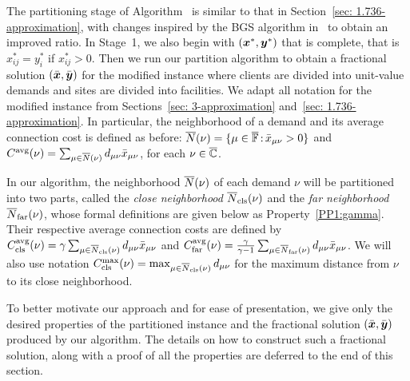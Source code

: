 \documentclass[11pt]{article}
\begin{document}

 The
partitioning stage of Algorithm~{\EBGS} is similar to that
in Section~\ref{sec: 1.736-approximation}, with changes
inspired by the BGS algorithm in~\cite{ByrkaGS10} to obtain
an improved ratio. In Stage~1, we also begin with
$(\boldsymbol{x}^\ast, \boldsymbol{y}^\ast)$ that is complete, that is
$x_{ij}^\ast=y_i^\ast$ if $x_{ij}^\ast>0$. Then we run our
partition algorithm to obtain a fractional solution
$(\bar{\boldsymbol{x}}, \bar{\boldsymbol{y}})$ for the modified instance where clients
are divided into unit-value demands and sites are divided
into facilities. We adapt all notation for the modified
instance from Sections~\ref{sec: 3-approximation}
and~\ref{sec: 1.736-approximation}. In particular, the
neighborhood of a demand and its average connection cost is
defined as before:
${\overline{N}}(\nu)=\{\mu\in\overline{\mathbb{F}}{\,:\,}
{\bar x}_{\mu\nu}>0\}$ and
$C^{{\mbox{\scriptsize\rm avg}}}(\nu)=\sum_{\mu\in{\overline{N}}(\nu)}d_{\mu\nu}{\bar x}_{\mu\nu}$,
for each $\nu\in\overline{\mathbb{C}}$.

In our algorithm, the neighborhood ${\overline{N}}(\nu)$ of each
demand $\nu$ will be partitioned into two parts, called the
\emph{close neighborhood} ${\overline{N}}_{\text{cls}}(\nu)$ and the
\emph{far neighborhood} ${\overline{N}}_{\text{far}}(\nu)$, whose formal
definitions are given below as
Property~\ref{PP1:gamma}. Their respective average
connection costs are defined by
$C_{\text{cls}}^{{\mbox{\scriptsize\rm avg}}}(\nu)=\gamma\sum_{\mu\in{\overline{N}}_{\text{cls}}(\nu)}
d_{\mu\nu}{\bar x}_{\mu\nu}$ and
$C_{\text{far}}^{{\mbox{\scriptsize\rm avg}}}(\nu)=\frac{\gamma}{\gamma-1}\sum_{\mu\in{\overline{N}}_{\text{far}}(\nu)}
d_{\mu\nu}{\bar x}_{\mu\nu}$.  We will also use notation
$C_{\text{cls}}^{\max}(\nu)=\max_{\mu\in{\overline{N}}_{\text{cls}}(\nu)} d_{\mu\nu}$ for
the maximum distance from $\nu$ to its close neighborhood.

\smallskip 

To better motivate our approach and for ease of
presentation, we give only the desired properties of the
partitioned instance and the fractional solution $(\bar{\boldsymbol{x}},
\bar{\boldsymbol{y}})$ produced by our algorithm. The details on how to
construct such a fractional solution, along with a proof of
all the properties are deferred to the end of this section.
\end{document}
